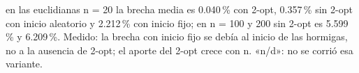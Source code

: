 {en las euclidianas n = 20 la brecha media es 0.040\,\% con 2-opt, 0.357\,\% sin 2-opt con inicio aleatorio y 2.212\,\% con inicio fijo; en n = 100 y 200 sin 2-opt es 5.599\,\% y 6.209\,\%.}
{Medido: la brecha con inicio fijo se debía al inicio de las hormigas, no a la ausencia de 2-opt; el aporte del 2-opt crece con n. «n/d»: no se corrió esa variante.}
